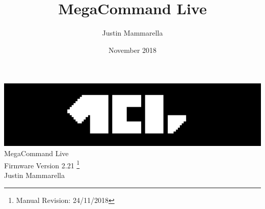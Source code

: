 \documentclass[openany,a4paper,12pt]{book}
\begin{document}
\author{Justin Mammarella}
\title{MegaCommand Live}
\date{November 2018}

\frontmatter
\begin{titlepage}

	\begin{center}
	\vspace*{5.75cm}
	\includegraphics{mcl_logo_black_short.png}
    \vspace*{1.00cm}
	\LARGE
	\vspace*{0.65cm}
	\\MegaCommand Live
    \large
	\\Firmware Version 2.21
	\footnote{Manual Revision: 24/11/2018}
    \vspace*{2cm}
    \\Justin Mammarella
\end{center}
\end{titlepage}


\tableofcontents

\mainmatter










 















\backmatter

\end{document}
